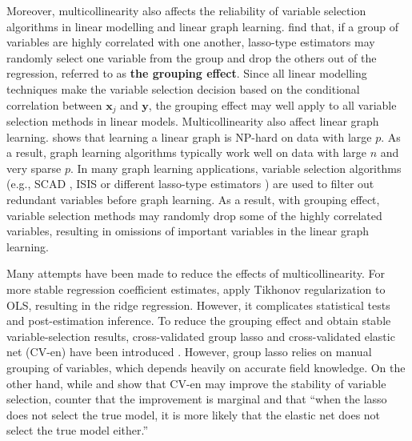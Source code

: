 Moreover, multicollinearity also affects the reliability of variable selection algorithms in linear modelling and linear graph learning. \citet{zou2005regularization, jia2010model} find that, if a group of variables are highly correlated with one another, lasso-type estimators may randomly select one variable from the group and drop the others out of the regression, referred to as \textbf{the grouping effect}. Since all linear modelling techniques make the variable selection decision based on the conditional correlation between $\mathbf{x}_j$ and $\mathbf{y}$, the grouping effect may well apply to all variable selection methods in linear models. Multicollinearity also affect linear graph learning. \citet{heckerman95, chickering04} shows that learning a linear graph is NP-hard on data with large $p$. As a result, graph learning algorithms typically work well on data with large $n$ and very sparse $p$. In many graph learning applications, variable selection algorithms (e.g., SCAD \citep{fan2001variable}, ISIS \citep{fan2008sure} or different lasso-type estimators \citep{fan2009network}) are used to filter out redundant variables before graph learning. As a result, with grouping effect, variable selection methods may randomly drop some of the highly correlated variables, resulting in omissions of important variables in the linear graph learning.

Many attempts have been made to reduce the effects of multicollinearity. For more stable regression coefficient estimates, \citet{hoerlkennard70} apply Tikhonov regularization to OLS, resulting in the ridge regression. However, it complicates statistical tests and post-estimation inference. To reduce the grouping effect and obtain stable variable-selection results, cross-validated group lasso and cross-validated elastic net (CV-en) have been introduced \citep{zou2005regularization, friedman10}. However, group lasso relies on manual grouping of variables, which depends heavily on accurate field knowledge. On the other hand, while \citet{zou2005regularization} and \citet{jia2010model} show that CV-en may improve the stability of variable selection, \citet{jia2010model} counter that the improvement is marginal and that ``when the lasso does not select the true model, it is more likely that the elastic net does not select the true model either.''